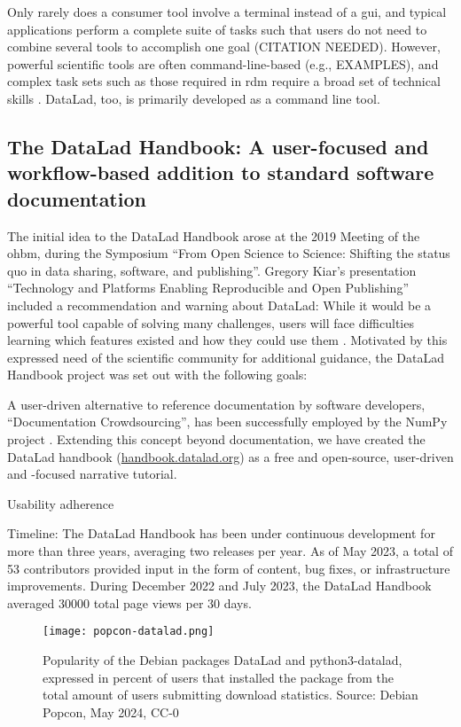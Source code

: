 Only rarely does a consumer tool involve a terminal instead of a \gls{gui}, and typical applications perform a complete suite of tasks such that users do not need to combine several tools to accomplish one goal (CITATION NEEDED).
However, powerful scientific tools are often command-line-based (e.g., EXAMPLES), and complex task sets such as those required in \gls{rdm} require a broad set of technical skills \citep{grisham2016proposed}.
DataLad, too, is primarily developed as a command line tool.

\pagebreak

\subsection{The DataLad Handbook: A user-focused and workflow-based addition to standard software documentation}

The initial idea to the DataLad Handbook arose at the 2019 Meeting of the \gls{ohbm}, during the Symposium ``From Open Science to Science: Shifting the status quo in data sharing, software, and publishing''.
Gregory Kiar's presentation ``Technology and Platforms Enabling Reproducible and Open Publishing'' included a recommendation and warning about DataLad: While it would be a powerful tool capable of solving many challenges, users will face difficulties learning which features existed and how they could use them \citep{kiar}.
Motivated by this expressed need of the scientific community for additional guidance, the DataLad Handbook project was set out with the following goals:



A user-driven alternative to reference documentation by software developers, ``Documentation Crowdsourcing'', has been successfully employed by the NumPy project \citep{pawlik2014crowdsourcing}.
Extending this concept beyond documentation, we have created the DataLad handbook (\href{http://handbook.datalad.org}{handbook.datalad.org}) as a free and open-source, user-driven and -focused narrative tutorial.



Usability adherence

Timeline:
The DataLad Handbook has been under continuous development for more than three years, averaging two releases per year.
As of May 2023, a total of 53 contributors provided input in the form of content, bug fixes, or infrastructure improvements.
During December 2022 and July 2023, the DataLad Handbook averaged 30000 total page views per 30 days.


\begin{figure}
	\texttt{[image: popcon-datalad.png]}
	\caption[Debian package popularity counts for DataLad]{Popularity of the Debian packages DataLad and python3-datalad, expressed in percent of users that installed the package from the total amount of users submitting download statistics. Source: Debian Popcon, May 2024, CC-0}
	\label{fig:popcon}
\end{figure}

\pagebreak

